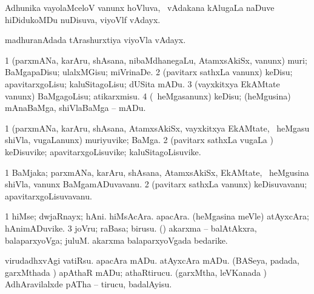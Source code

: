 \bentry
{} 
\gl{\nA}
\expl{}
\bmng
 Adhunika vayolaMceloV  vanunx hoVluva, \kanmu\ vAdakana kAlugaLa naDuve hiDidukoMDu nuDisuva, viyoVlf vAdayx. 
\emng
\eentry

\bentry
{} 
\gl{\nA}
\expl{}
\bmng
 madhuranAdada tArashurxtiya viyoVla vAdayx. 
\emng
\eentry

\bentry
{} 
\gl{\sakirx}
\expl{}
\bmng
\bnum
\num{1} (parxmANa, karAru, shAsana, nibaMdhanegaLu, AtamxsAkiSx, \mo vanunx) muri; BaMgapaDisu; ulalxMGisu; miVrinaDe. 
\num{2} (pavitarx sathxLa \mo vanunx) keDisu; apavitarxgoLisu; kaluSitagoLisu; dUSita mADu. 
\num{3} (vayxkitxya EkAMtate \mo vanunx) BaMgagoLisu; atikarxmisu. 
\num{4} (\sA\ heMgasanunx) keDisu; (heMgusina) mAnaBaMga, shiVlaBaMga -- mADu. 
\enum
\emng
\eentry

\bentry
{} 
\gl{\nA}
\expl{}
\bmng
\bnum
\num{1} (parxmANa, karAru, shAsana, AtamxsAkiSx, vayxkitxya EkAMtate, \sA\ heMgasu shiVla, \mo vugaLanunx) muriyuvike; BaMga. 
\num{2} (pavitarx sathxLa \mo vugaLa \vi) keDisuvike; apavitarxgoLisuvike; kaluSitagoLisuvike. 
\enum
\emng
\eentry

\bentry
{} 
\gl{\nA}
\expl{}
\bmng
\bnum
\num{1} BaMjaka; parxmANa, karAru, shAsana, AtamxsAkiSx, EkAMtate, \sA\ heMgusina shiVla, \mo vanunx BaMgamADuvavanu. 
\num{2} (pavitarx sathxLa \mo vanunx) keDisuvavanu; apavitarxgoLisuvavanu. 
\enum
\emng
\eentry

\bentry
{} 
\gl{\nA}
\expl{}
\bmng
\bnum
\num{1} hiMse; dwjaRnayx; hAni. 
\banum
{} hiMsAcAra. 
 apacAra. 
 (heMgasina meVle) atAyxcAra; hAnimADuvike. 
\eanum
\numie
\num{3} joVru; raBasa; birusu. 
 (\nAyxshA) 
\banum
{} akarxma -- balAtAkxra, balaparxyoVga; juluM. 
 akarxma balaparxyoVgada bedarike. 
\eanum
\numie
\enum
\emng

\noindent
\gl{\pagu}
\expl{}
\bmng
\banum
{} virudadhxvAgi vatiRsu. 
 apacAra mADu. 
 atAyxcAra mADu. 
 (BASeya, padada, garxMthada \vi) apAthaR mADu; athaRtirucu. 
 (garxMtha, leVKanada \vi) AdhAravilalxde pATha -- tirucu, badalAyisu. 
\eanum
\emng
\eentry

